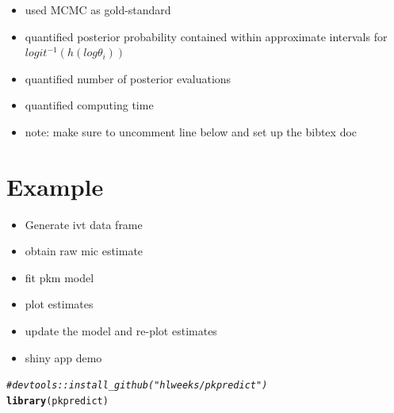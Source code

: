\documentclass{article}\usepackage[]{graphicx}\usepackage[]{color}
\makeatletter
\newcommand{\hlcom}[1]{\textcolor[rgb]{0.678,0.584,0.686}{\textit{#1}}}%
\newcommand{\hlstd}[1]{\textcolor[rgb]{0.345,0.345,0.345}{#1}}%
\newcommand{\hlkwd}[1]{\textcolor[rgb]{0.737,0.353,0.396}{\textbf{#1}}}%
\newenvironment{kframe}{%
 \def\at@end@of@kframe{}%
 \ifinner\ifhmode%
  \def\at@end@of@kframe{\end{minipage}}%
  \begin{minipage}{\columnwidth}%
 \fi\fi%
 \def\FrameCommand##1{\hskip\@totalleftmargin \hskip-\fboxsep
 \colorbox{shadecolor}{##1}\hskip-\fboxsep
     \hskip-\linewidth \hskip-\@totalleftmargin \hskip\columnwidth}%
 \MakeFramed {\advance\hsize-\width
   \@totalleftmargin\z@ \linewidth\hsize
   \@setminipage}}%
 {\par\unskip\endMakeFramed%
 \at@end@of@kframe}
\newenvironment{knitrout}{}{} %
\makeatother
\begin{document}
\begin{itemize}
\item used MCMC as gold-standard
\item quantified posterior probability contained within approximate intervals for $logit^{-1}(h(log \theta_i))$
\item quantified number of posterior evaluations %
\item quantified computing time %
\item note: make sure to uncomment line below and set up the bibtex doc
\end{itemize}




%



\section{Example}

\begin{itemize}
  \item Generate ivt data frame
  \item obtain raw mic estimate
  \item fit pkm model
  \item plot estimates
  \item update the model and re-plot estimates
  \item shiny app demo
\end{itemize}

\begin{knitrout}
\color{fgcolor}\begin{kframe}
\begin{alltt}
\hlcom{# devtools::install_github("hlweeks/pkpredict")}
\hlkwd{library}\hlstd{(pkpredict)}
\end{alltt}
\end{kframe}
\end{knitrout}
\end{document}
